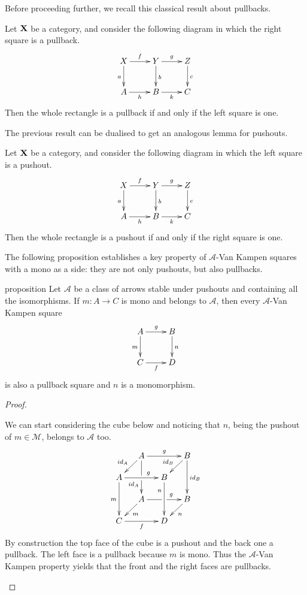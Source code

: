 \documentclass[a4paper,UKenglish,cleveref,pdftex, thm-restate,numberwithinsect]{lipics}
\newcommand{\id}[1]{\mathsf{id}_{#1}}
\def\C{\textbf {\textup{C}}}
\def\X{\textbf {\textup{X}}}
\begin{document}
Before proceeding further, we recall this classical result about pullbacks.

\begin{lemma}\label{lem:pb1}
	Let $\X$ be a category, and consider the following diagram 	in which the right square is a pullback.
	\[\xymatrix{X \ar[d]_{a} \ar[r]^{f}& \ar[r]^{g} Y \ar[d]^{b}& Z \ar[d]^{c}\\ A \ar[r]_{h}& B \ar[r]_{k}& C}\]
	Then the whole rectangle is a pullback if and only if the left square is one.
\end{lemma}

The previous result can be dualised to get an analogous lemma for pushouts.

\begin{lemma}\label{lem:po1}
	Let $\X$ be a category, and consider the following diagram 	in which the left square is a pushout.
	\[\xymatrix{X \ar[d]_{a} \ar[r]^{f}& \ar[r]^{g} Y \ar[d]^{b}& Z \ar[d]^{c}\\ A \ar[r]_{h}& B \ar[r]_{k}& C}\]
	Then the whole rectangle is a pushout if and only if the right square is one.
\end{lemma}

The following proposition establishes a key property of $\mathcal{A}$-Van Kampen squares with a mono as a side: they are not only pushouts, but also pullbacks.
\begin{theoremEnd}[category=sec2]{proposition}\label{prop:pbpo} Let $\mathcal{A}$ be a class of arrows stable under pushouts and containing all the isomorphisms.  If $m\colon A\to C$ is mono and belongs to $\mathcal{A}$, then every $\mathcal{A}$-Van Kampen square
	\[\xymatrix{A\ar[r]^{g} \ar[d]_{m} & B \ar[d]^{n} \\ C \ar[r]_{f}  & D}\]
	is also a pullback square and $n$ is a monomorphism.
\end{theoremEnd}
\begin{proof}\begin{proofEnd}
		We can start considering the cube below and noticing that $n$, being the pushout of $m\in \mathcal{M}$, belongs to $\mathcal{A}$ too.
		\[\xymatrix@C=13pt@R=13pt{&A\ar[dd]|\hole_(.65){\id{A}}\ar[rr]^{g} \ar[dl]_{\id{A}} && B \ar[dd]^{\id{B}} \ar[dl]_{\id{B}} \\ A  \ar[dd]_{m}\ar[rr]^(.65){g} & & B \ar[dd]_(.3){n}\\&A\ar[rr]|\hole^(.65){g} \ar[dl]^{m} && B \ar[dl]^{n} \\C \ar[rr]_{f} & & D}\]
		By construction the top face of the cube is a pushout and the back one a pullback. The left face is a pullback because $m$ is mono. Thus the $\mathcal{A}$-Van Kampen property yields that the front and the right faces are pullbacks. 
	\end{proofEnd} 
\end{proof}
\end{document}
